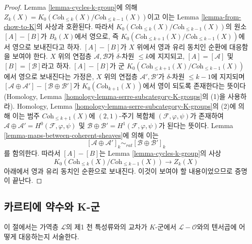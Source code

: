 \begin{proof}
Lemma \ref{lemma-cycles-k-group}에 의해
$Z_k(X) = K_0(\textit{Coh}_{\leq k}(X)/\textit{Coh}_{\leq k - 1}(X))$이고
이는 Lemma \ref{lemma-from-chow-to-K}의 사상과 호환된다. 따라서
$K_0(\textit{Coh}_{\leq k}(X)/\textit{Coh}_{\leq k - 1}(X))$의 원소
$[A] - [B]$가 $B_k(X)$에서 영으로, 즉
$K_0(\textit{Coh}_{\leq k + 1}(X)/\textit{Coh}_{\leq k - 1}(X))$에서
영으로 보내진다고 하자. $[A] - [B]$가 $X$ 위에서 영과 유리 동치인
순환에 대응함을 보여야 한다. $X$ 위의 연접층 $\mathcal{A}, \mathcal{B}$가
$\delta$-차원 $\leq k$에 지지되고,
$[A] = [\mathcal{A}]$ 및 $[B] = [\mathcal{B}]$라고 하자.
$[A] - [B]$가 군
$K_0(\textit{Coh}_{\leq k + 1}(X)/\textit{Coh}_{\leq k - 1}(X))$에서
영으로 보내진다는 가정은, $X$ 위의 연접층
$\mathcal{A}', \mathcal{B}'$가 $\delta$-차원 $\leq k - 1$에 지지되며
$[\mathcal{A} \oplus \mathcal{A}'] - [\mathcal{B} \oplus \mathcal{B}']$가
$K_0(\textit{Coh}_{k + 1}(X))$에서 영이 되도록 존재한다는 뜻이다
(Homology, Lemma \ref{homology-lemma-serre-subcategory-K-groups}의
(1)을 사용하라). Homology, Lemma
\ref{homology-lemma-serre-subcategory-K-groups}의 (2)에 의해 이는
범주 $\textit{Coh}_{\leq k + 1}(X)$에 $(2, 1)$-주기 복합체
$(\mathcal{F}, \varphi, \psi)$가 존재하여
$\mathcal{A} \oplus \mathcal{A}' = H^0(\mathcal{F}, \varphi, \psi)$ 및
$\mathcal{B} \oplus \mathcal{B}' = H^1(\mathcal{F}, \varphi, \psi)$가
된다는 뜻이다. Lemma \ref{lemma-maps-between-coherent-sheaves}에 의해
이는
$$
[\mathcal{A} \oplus \mathcal{A}']_k
\sim_{rat}
[\mathcal{B} \oplus \mathcal{B}']_k
$$
를 함의한다. 따라서 $[A] - [B]$는 Lemma
\ref{lemma-cycles-k-group}의 사상
$$
K_0(\textit{Coh}_{\leq k}(X)/\textit{Coh}_{\leq k - 1}(X))
\longrightarrow Z_k(X)
$$
아래에서 영과 유리 동치인 순환으로 보내진다. 이것이 보여야 할
내용이었으므로 증명이 끝난다.
\end{proof}














\subsection{카르티에 약수와 K-군}
\label{subsection-cartier-coherent}

\noindent
이 절에서는 가역층 $\mathcal{L}$의 제1 천 특성류와의 교차가
$K$-군에서 $\mathcal{L} - \mathcal{O}$와의 텐서곱에 어떻게
대응하는지 서술한다.


